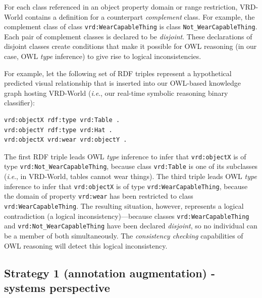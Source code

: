 \documentclass[]{jair}
\newcommand{\ie}{\textit{i}.\textit{e}.,\xspace}
\begin{document}
For each class referenced in an object property domain or range restriction, VRD-World contains a definition for a counterpart \emph{complement} class.
For example, the complement class of class \texttt{vrd:WearCapableThing} is class \texttt{Not\_WearCapableThing}.
Each pair of complement classes is declared to be \emph{disjoint}.
These declarations of disjoint classes create conditions that make it possible for OWL reasoning (in our case, OWL \emph{type} inference) to give rise to logical inconsistencies.

For example, let the following set of RDF triples represent a hypothetical predicted visual relationship that is inserted into our OWL-based knowledge graph hosting VRD-World (\ie our real-time symbolic reasoning binary classifier):%
\begin{verbatim}
vrd:objectX rdf:type vrd:Table .
vrd:objectY rdf:type vrd:Hat .
vrd:objectX vrd:wear vrd:objectY .
\end{verbatim}
The first RDF triple leads OWL \emph{type} inference to infer that \texttt{vrd:objectX} is of type \texttt{vrd:Not\_WearCapableThing}, because class \texttt{vrd:Table} is one of its subclasses (\ie in VRD-World, tables cannot wear things).
The third triple leads OWL \emph{type} inference to infer that \texttt{vrd:objectX} is of type \texttt{vrd:WearCapableThing}, because the domain of property \texttt{vrd:wear} has been restricted to class \texttt{vrd:WearCapableThing}.
The resulting situation, however, represents a logical contradiction (a logical inconsistency)---because classes \texttt{vrd:WearCapableThing} and \texttt{vrd:Not\_WearCapableThing} have been declared \emph{disjoint}, so no individual can be a member of both simultaneously.
The \emph{consistency checking} capabilities of OWL reasoning will detect this logical inconsistency.




\subsection{Strategy 1 (annotation augmentation) - systems perspective}
\label{sec:methods-strategy-1}
\end{document}
